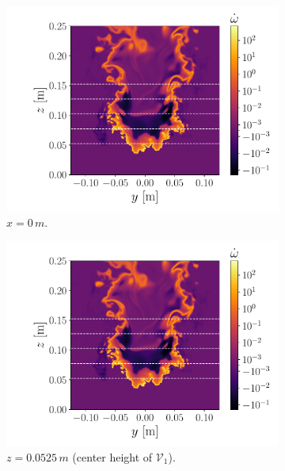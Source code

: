 \documentclass[review]{elsarticle}
\begin{document}
\begin{figure}[!tbp]%
  \centering%
  \begin{subfigure}[t]{0.48\textwidth}%
    \includegraphics[page=1,width=\textwidth, trim = 1.2cm 0cm 0.4cm 0cm, clip=true]{./figs/src_pv.pdf}%
    \caption{$x=0\,\unit{m}$.}%
  \end{subfigure}\hfill%
  \begin{subfigure}[t]{0.48\textwidth}%
    \includegraphics[page=2,width=\textwidth, trim = 1.2cm 0cm 0.4cm 0cm, clip=true]{./figs/src_pv.pdf}%
    \caption{$z=0.0525\,\unit{m}$ (center height of $\mathcal{V}_{1}$).}%
  \end{subfigure}\\%
  \begin{subfigure}[t]{0.48\textwidth}%

\end{subfigure}
\end{figure}
\end{document}

